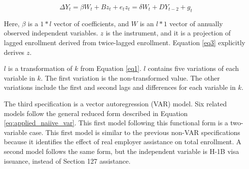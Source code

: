 \documentclass[review]{elsarticle}
\begin{document}
\begin{subequations}
    \begin{equation}
        \Delta{Y_t} = \beta{W_{t}}+B{z_t}+e_t
        \label{eq2}
    \end{equation}
    \begin{equation}
        z_t = \delta{W_{t}}+D{Y_{t-2}}+g_t
        \label{eq3}
    \end{equation}
\end{subequations}

Here, $\beta$ is a $1*l$ vector of coefficients,
and $W$ is an $l*1$ vector of annually observed independent variables.
$z$ is the instrument, and it is a projection of lagged enrollment derived from twice-lagged enrollment.
Equation \ref{eq3} explicitly derives $z$.

$l$ is a transformation of $k$ from Equation \ref{eq1}.
$l$ contains five variations of each variable in $k$.
The first variation is the non-transformed value.
The other variations include the first and second lags and differences for each variable in $k$.

The third specification is a vector autoregression (VAR) model.
Six related models follow the general reduced form
described in Equation \ref{eq:applied_naiive_var}.
This first model following this functional form is a two-variable case.
This first model is similar to the previous non-VAR
specifications because it identifies the effect of
real employer assistance on total enrollment.
A second model follows the same form,
but the independent variable is H-1B visa issuance,
instead of Section 127 assistance.
\end{document}
